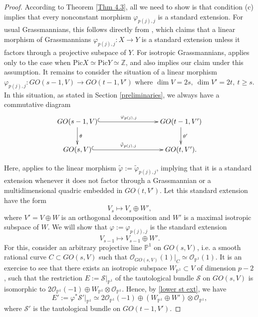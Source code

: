 \documentclass[12pt]{amsart}
\renewcommand{\phi}{\varphi}
\theoremstyle{definition}
\begin{document}
\begin{proof}
According to Theorem \ref{Thm 4.3}, all we need to show is that
condition (c) implies that every nonconstant morphism 
$\phi_{p(j),j}$ is a standard extension. For usual 
Grassmannians, this follows directly from \cite[Thm. 1]{PT}, 
which claims that a linear morphism of Grassmannians $\phi_{p(j
),j}:X\to Y$ is a standard extension unless it factors through a 
projective subspace of $Y$. For isotropic
Grassmannians, \cite[Thm. 1]{PT} applies only to the case when
$\mathrm{Pic}X\simeq\mathrm{Pic}Y\simeq\mathbb{Z}$, and also
implies our claim under this assumption. It remains to
consider the situation of a linear morphism $\phi_{p(j),j}:
GO(s-1,V)\to GO(t-1,V')$ where $\dim V=2s,\ \dim V'=2t,\ t\ge 
s$. In this situation, as stated in Section 
\ref{preliminaries}, we always have a commutative diagram
\begin{equation*}\label{diag with theta}
\xymatrix{
GO(s-1,V)\ar@{^{(}->}[rrr]^-{\phi_{p(j),j}}\ar[d]^-{\theta} 
& & & GO(t-1,V')\ar[d]^-{\theta'} \\
GO(s,V) \ar@{^{(}->}[rrr]^-{\tilde{\phi}_{p(j),j}} & & & 
GO(t,V').}
\end{equation*}

Here, \cite[Thm. 1]{PT} applies to the linear morphism
$\tilde{\phi}:=\tilde{\phi}_{p(j),j}$, implying that it is a 
standard extension whenever it does not factor through a 
Grassmannian or a multidimensional quadric embedded in 
$GO(t,V')$. Let this standard extension have the form 
\begin{equation}\label{lower st ext}
V_s\mapsto V_s\oplus W',
\end{equation}
where $V'=V\oplus W$ is an orthogonal decomposition and $W'$ is
a maximal isotropic subspace of $W$. We will show that 
$\phi:=\phi_{p(j),j}$ is the standard extension 
\begin{equation}\label{upper st ext}
V_{s-1}\mapsto V_{s-1}\oplus W'.
\end{equation}
For this, consider an arbitrary projective line $\mathbb{P}^1$
on $GO(s,V)$, i.e. a smooth rational curve $C\subset GO(s,V)$ 
such that $\mathcal{O}_{GO(s,V)}(1)|_C\simeq\mathcal{O}_{
\mathbb{P}^1}(1)$. It is an exercise to see that there exists 
an isotropic subspace $W_{\mathbb{P}^1}\subset V$ of dimension 
$p-2$, such that the restriction $E:=\mathcal{S}|
_{\mathbb{P}^1}$ of the tautological bundle $\mathcal{S}$ on 
$GO(s,V)$ is isomorphic to $2\mathcal{O}_{\mathbb{P}^1}(-1)
\oplus W_{\mathbb{P}^1}\otimes\mathcal{O}_{\mathbb{P}^1}
$. Hence, by \eqref{lower st ext}, we have 
\begin{equation}\label{restr S'}
E':=\phi^*\mathcal{S}'|_{\mathbb{P}^1}\simeq
2\mathcal{O}_{\mathbb{P}^1}(-1)\oplus(W_{\mathbb{P}^1}\oplus W')\otimes\mathcal{O}_{\mathbb{P}^1},
\end{equation}
where $\mathcal{S}'$ is the tautological bundle on $GO(t-1,V')$. 


\end{proof}
\end{document}
